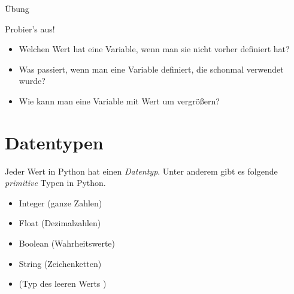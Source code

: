 \begin{frame}

\end{frame}

\begin{frame}{Übung}
	
	\begin{block}{Probier's aus!}
		\begin{itemize}
			\item Welchen Wert hat eine Variable, wenn man sie nicht vorher definiert hat? 
			\item Was passiert, wenn man eine Variable definiert, die schonmal verwendet wurde?
			\item Wie kann man eine Variable mit Wert  um  vergrößern?
		\end{itemize}	
	\end{block}
	
\end{frame}


\section{Datentypen}

\begin{frame}
	\begin{block}{}
		Jeder Wert in Python hat einen \textit{Datentyp}. Unter anderem gibt es folgende \textit{primitive} Typen in Python.
		\begin{itemize}
			\item {}  Integer (ganze Zahlen)
			\item {} Float (Dezimalzahlen)
			\item {} Boolean (Wahrheitswerte)
			\item {}  String (Zeichenketten)
			\item {} (Typ des leeren Werts )
		\end{itemize}
	\end{block}
\end{frame}


